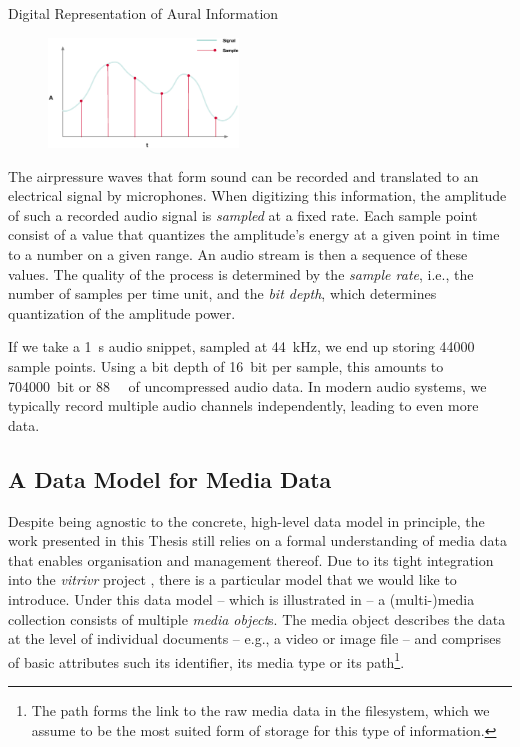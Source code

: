 \begin{example}[label=example:representation_audio_information]{Digital Representation of Aural Information}{}
    \begin{figure}
        \includegraphics[width=0.45\textwidth]{figures/example-audio-signal.eps}
    \end{figure}
    The airpressure waves that form sound can be recorded and translated to an electrical signal by microphones. When digitizing this information, the amplitude of such a recorded audio signal is \emph{sampled} at a fixed rate. Each sample point consist of a value that quantizes the amplitude's energy at a given point in time to a number on a given range. An audio stream is then a sequence of these values. The quality of the process is determined by the \emph{sample rate}, i.e., the number of samples per time unit, and the \emph{bit depth}, which determines quantization of the amplitude power.

    If we take a \SI{1}{\second} audio snippet, sampled at \SI{44}{\kilo\hertz}, we end up storing \num{44000} sample points. Using a bit depth of \SI{16}{bit} per sample, this amounts to \SI{704000}{bit} or \SI{88}{\kilo\byte} of uncompressed audio data. In modern audio systems, we typically record multiple audio channels independently, leading to even more data.
\end{example}

\subsection{A Data Model for Media Data}
\label{section:media_data_model}
Despite being agnostic to the concrete, high-level data model in principle, the work presented in this Thesis still relies on a formal understanding of media data that enables organisation and management thereof. Due to its tight integration into the \emph{vitrivr} project \cite{Rossetto:2016vitrivr,Gasser:2019multimodal,Heller:2020multi}, there is a particular model that we would like to introduce. Under this data model -- which is illustrated in  -- a (multi-)media collection consists of multiple \emph{media object}s. The media object describes the data at the level of individual documents -- e.g., a video or image file -- and comprises of basic attributes such its identifier, its media type or its path\footnote{The path forms the link to the raw media data in the filesystem, which we assume to be the most suited form of storage for this type of information.}. 

